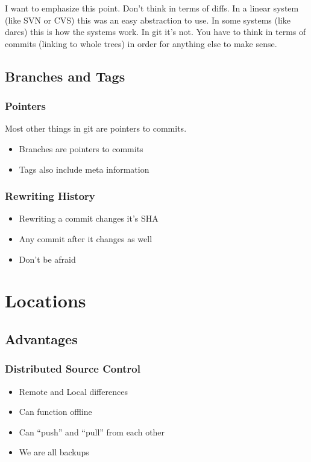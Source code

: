 I want to emphasize this point. Don't think in terms of diffs. In a linear
system (like SVN or CVS) this was an easy abstraction to use. In some systems
(like darcs) this is how the systems work. In git it's not. You have to think in
terms of commits (linking to whole trees) in order for anything else to make
sense.

\subsection{Branches and Tags}

\begin{frame}
  \frametitle{Pointers}
  Most other things in git are pointers to commits.
  \begin{itemize}
  \item Branches are pointers to commits
  \item Tags also include meta information
  \end{itemize}
\end{frame}

\begin{frame}
  \frametitle{Rewriting History}
  \begin{itemize}
  \item Rewriting a commit changes it's SHA
    \pause
  \item Any commit after it changes as well
    \pause
  \item Don't be afraid
  \end{itemize}
\end{frame}

\section{Locations}

\subsection{Advantages}

\begin{frame}
  \frametitle{Distributed Source Control}
  \begin{itemize}
  \item Remote and Local differences
    \pause
  \item Can function offline
    \pause
  \item Can ``push'' and ``pull'' from each other
    \pause
  \item We are all backups
  \end{itemize}
\end{frame}

